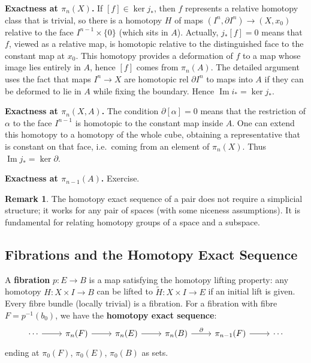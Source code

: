 \documentclass{article}
\theoremstyle{definition}
\newtheorem{remark}{Remark}[section]
\begin{document}
\textbf{Exactness at $\pi_n(X)$.} If $[f]\in\ker j_*$, then $f$ represents a relative homotopy class that is trivial, so there is a homotopy $H$ of maps $(I^n,\partial I^n)\to (X,x_0)$ relative to the face $I^{n-1}\times\{0\}$ (which sits in $A$). Actually, $j_*[f]=0$ means that $f$, viewed as a relative map, is homotopic relative to the distinguished face to the constant map at $x_0$. This homotopy provides a deformation of $f$ to a map whose image lies entirely in $A$, hence $[f]$ comes from $\pi_n(A)$. The detailed argument uses the fact that maps $I^n\to X$ are homotopic rel $\partial I^n$ to maps into $A$ if they can be deformed to lie in $A$ while fixing the boundary. Hence $\operatorname{Im} i_* = \ker j_*$.

\textbf{Exactness at $\pi_n(X,A)$.} The condition $\partial[\alpha]=0$ means that the restriction of $\alpha$ to the face $I^{n-1}$ is homotopic to the constant map inside $A$. One can extend this homotopy to a homotopy of the whole cube, obtaining a representative that is constant on that face, i.e.\ coming from an element of $\pi_n(X)$. Thus $\operatorname{Im} j_* = \ker \partial$.

\textbf{Exactness at $\pi_{n-1}(A)$.} Exercise.

\begin{remark}
The homotopy exact sequence of a pair does not require a simplicial structure; it works for any pair of spaces (with some niceness assumptions). It is fundamental for relating homotopy groups of a space and a subspace.
\end{remark}

\subsection{Fibrations and the Homotopy Exact Sequence}
A \textbf{fibration} $p: E \to B$ is a map satisfying the homotopy lifting property: any homotopy $H: X\times I \to B$ can be lifted to $\widetilde{H}: X\times I \to E$ if an initial lift is given. Every fibre bundle (locally trivial) is a fibration. For a fibration with fibre $F = p^{-1}(b_0)$, we have the \textbf{homotopy exact sequence}:
\[
\begin{tikzcd}
\cdots \arrow[r] & \pi_n(F) \arrow[r] & \pi_n(E) \arrow[r] & \pi_n(B) \arrow[r, "\partial"] & \pi_{n-1}(F) \arrow[r] & \cdots
\end{tikzcd}
\]
ending at $\pi_0(F)$, $\pi_0(E)$, $\pi_0(B)$ as sets.
\end{document}
